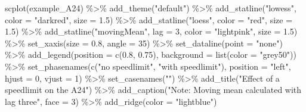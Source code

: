 \documentclass[
  letterpaper,
  DIV=11,
  numbers=noendperiod]{scrreprt}
\newenvironment{Shaded}{\begin{snugshade}}{\end{snugshade}}
\newcommand{\AttributeTok}[1]{\textcolor[rgb]{0.40,0.45,0.13}{#1}}
\newcommand{\DecValTok}[1]{\textcolor[rgb]{0.68,0.00,0.00}{#1}}
\newcommand{\FloatTok}[1]{\textcolor[rgb]{0.68,0.00,0.00}{#1}}
\newcommand{\FunctionTok}[1]{\textcolor[rgb]{0.28,0.35,0.67}{#1}}
\newcommand{\NormalTok}[1]{\textcolor[rgb]{0.00,0.23,0.31}{#1}}
\newcommand{\SpecialCharTok}[1]{\textcolor[rgb]{0.37,0.37,0.37}{#1}}
\newcommand{\StringTok}[1]{\textcolor[rgb]{0.13,0.47,0.30}{#1}}
\begin{document}
\begin{Shaded}
\begin{Highlighting}[]
\FunctionTok{scplot}\NormalTok{(example\_A24) }\SpecialCharTok{\%\textgreater{}\%} 
  \FunctionTok{add\_theme}\NormalTok{(}\StringTok{"default"}\NormalTok{) }\SpecialCharTok{\%\textgreater{}\%}
  \FunctionTok{add\_statline}\NormalTok{(}\StringTok{"lowess"}\NormalTok{, }\AttributeTok{color =} \StringTok{"darkred"}\NormalTok{, }\AttributeTok{size =} \FloatTok{1.5}\NormalTok{) }\SpecialCharTok{\%\textgreater{}\%}
  \FunctionTok{add\_statline}\NormalTok{(}\StringTok{"loess"}\NormalTok{, }\AttributeTok{color =} \StringTok{"red"}\NormalTok{, }\AttributeTok{size =} \FloatTok{1.5}\NormalTok{) }\SpecialCharTok{\%\textgreater{}\%}
  \FunctionTok{add\_statline}\NormalTok{(}\StringTok{"movingMean"}\NormalTok{, }\AttributeTok{lag =} \DecValTok{3}\NormalTok{, }\AttributeTok{color =} \StringTok{"lightpink"}\NormalTok{, }\AttributeTok{size =} \FloatTok{1.5}\NormalTok{) }\SpecialCharTok{\%\textgreater{}\%}
  \FunctionTok{set\_xaxis}\NormalTok{(}\AttributeTok{size =} \FloatTok{0.8}\NormalTok{, }\AttributeTok{angle =} \DecValTok{35}\NormalTok{) }\SpecialCharTok{\%\textgreater{}\%}
  \FunctionTok{set\_dataline}\NormalTok{(}\AttributeTok{point =} \StringTok{"none"}\NormalTok{) }\SpecialCharTok{\%\textgreater{}\%}
  \FunctionTok{add\_legend}\NormalTok{(}\AttributeTok{position =} \FunctionTok{c}\NormalTok{(}\FloatTok{0.8}\NormalTok{, }\FloatTok{0.75}\NormalTok{), }\AttributeTok{background =} \FunctionTok{list}\NormalTok{(}\AttributeTok{color =} \StringTok{"grey50"}\NormalTok{)) }\SpecialCharTok{\%\textgreater{}\%}
  \FunctionTok{set\_phasenames}\NormalTok{(}\FunctionTok{c}\NormalTok{(}\StringTok{"no speedlimit"}\NormalTok{, }\StringTok{"with speedlimit"}\NormalTok{), }\AttributeTok{position =} \StringTok{"left"}\NormalTok{, }
                 \AttributeTok{hjust =} \DecValTok{0}\NormalTok{, }\AttributeTok{vjust =} \DecValTok{1}\NormalTok{) }\SpecialCharTok{\%\textgreater{}\%}
  \FunctionTok{set\_casenames}\NormalTok{(}\StringTok{""}\NormalTok{) }\SpecialCharTok{\%\textgreater{}\%}
  \FunctionTok{add\_title}\NormalTok{(}\StringTok{"Effect of a speedlimit on the A24"}\NormalTok{) }\SpecialCharTok{\%\textgreater{}\%}
  \FunctionTok{add\_caption}\NormalTok{(}\StringTok{"Note: Moving mean calculated with lag three"}\NormalTok{, }\AttributeTok{face =} \DecValTok{3}\NormalTok{) }\SpecialCharTok{\%\textgreater{}\%}
  \FunctionTok{add\_ridge}\NormalTok{(}\AttributeTok{color =} \StringTok{"lightblue"}\NormalTok{)}
\end{Highlighting}
\end{Shaded}
\end{document}
